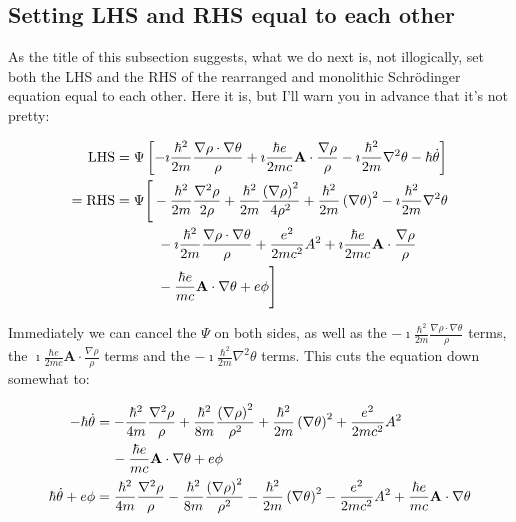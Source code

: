 \newcommand{\lhs}[0]{\Psi \left[ - \imath \frac{\hbar^2}{2m} \frac{\nabla \rho
        \cdot \nabla \theta}{\rho} + \imath \frac{\hbar e}{2mc} \mathbf{A} \cdot
        \frac{\nabla \rho}{\rho} - \imath \frac{\hbar^2}{2m} \nabla^2 \theta -
        \hbar \dot \theta \right]}

\newcommand{\rhs}[0]{\Psi \Bigg[ - \frac{\hbar^2}{2m} \frac{\nabla^2
        \rho}{2\rho} + \frac{\hbar^2}{2m} \frac{\left( \nabla \rho \right)^2}{4
        \rho^2} + \frac{\hbar^2}{2m} \left( \nabla \theta \right)^2 - \imath
        \frac{\hbar^2}{2m} \nabla^2 \theta \notag \\ & \hspace{30pt} - \imath
        \frac{\hbar^2}{2m} \frac{\nabla \rho \cdot \nabla \theta}{\rho} +
        \frac{e^2}{2mc^2} A^2 + \imath \frac{\hbar e}{2mc} \mathbf{A} \cdot
        \frac{\nabla \rho}{\rho} \\ & \hspace{30pt} - \frac{\hbar e}{mc}
        \mathbf{A} \cdot \nabla \theta + e \phi \Bigg] \notag}

\subsection{Setting LHS and RHS equal to each other}

As the title of this subsection suggests, what we do next is, not illogically,
set both the LHS and the RHS of the rearranged and monolithic Schr\"odinger
equation equal to each other. Here it is, but I'll warn you in advance that it's
not pretty:

\begin{align}
    \mathrm{LHS} &= \lhs \\
  = \mathrm{RHS} &= \rhs
\end{align}

Immediately we can cancel the $\Psi$ on both sides, as well as the $- \imath
\frac{\hbar^2}{2m} \frac{\nabla \rho \cdot \nabla \theta}{\rho}$ terms, the
$\imath \frac{\hbar e}{2mc} \mathbf{A} \cdot \frac{\nabla \rho}{\rho}$ terms and
the $- \imath \frac{\hbar^2}{2m} \nabla^2 \theta$ terms. This cuts the equation
down somewhat to:

\begin{align}
    - \hbar \dot \theta
    &=  - \frac{\hbar^2}{4m} \frac{\nabla^2 \rho}{\rho}
        + \frac{\hbar^2}{8m} \frac{ \left( \nabla \rho \right)^2}{\rho^2}
        + \frac{\hbar^2}{2m} \left( \nabla \theta \right)^2
        + \frac{e^2}{2mc^2}A^2 \notag \\
    & \hspace{11.5pt} - \frac{\hbar e}{mc} \mathbf{A} \cdot \nabla \theta
        + e \phi \\
    \hbar \dot \theta + e \phi
    &=  \frac{\hbar^2}{4m} \frac{\nabla^2 \rho}{\rho}
        - \frac{\hbar^2}{8m} \frac{ \left( \nabla \rho \right)^2}{\rho^2}
        - \frac{\hbar^2}{2m} \left( \nabla \theta \right)^2
        - \frac{e^2}{2mc^2}A^2
        + \frac{\hbar e}{mc} \mathbf{A} \cdot \nabla \theta
\end{align}

